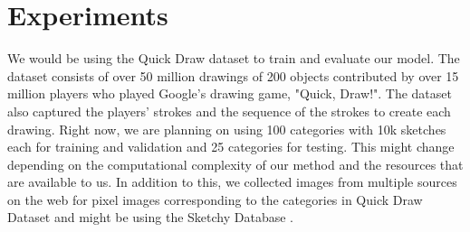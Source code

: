 \documentclass{article}
\begin{document}
\section{Experiments}
We would be using the Quick Draw dataset \cite{quickdraw} to train and evaluate our model. The dataset consists of over 50 million drawings of 200 objects contributed by over 15 million players who played Google’s drawing game, "Quick, Draw!". The dataset also captured the players' strokes and the sequence of the strokes to create each drawing. Right now, we are planning on using 100 categories with 10k sketches each for training and validation and 25 categories for testing. This might change depending on the computational complexity of our method and the resources that are available to us. In addition to this, we collected images from multiple sources on the web for pixel images corresponding to the categories in Quick Draw Dataset and might be using the Sketchy Database \cite{sketchydb}.
\end{document}
